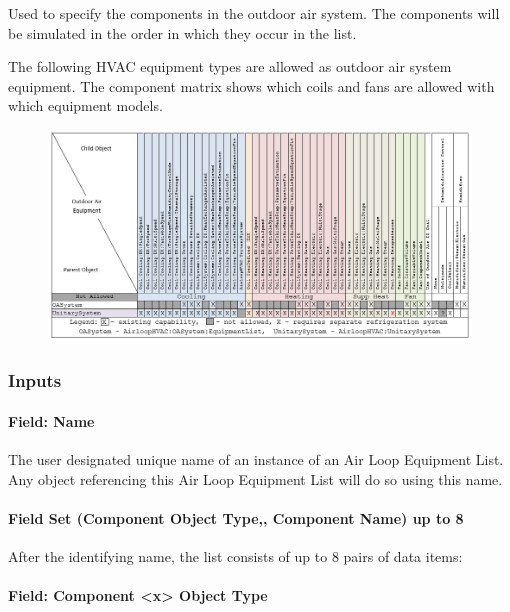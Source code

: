Used to specify the components in the outdoor air system. The components will be simulated in the order in which they occur in the list.

The following HVAC equipment types are allowed as outdoor air system equipment. The component matrix shows which coils and fans are allowed with which equipment models.

\begin{figure}[htbp]
\centering
\includegraphics{media/OASysComponentMatrix.png}
\caption{}
\end{figure}

\subsubsection{Inputs}\label{inputs-4-001}

\paragraph{Field: Name}\label{field-name-4-001}

The user designated unique name of an instance of an Air Loop Equipment List. Any object referencing this Air Loop Equipment List will do so using this name.

\paragraph{Field Set (Component Object Type,, Component Name) up to 8}\label{field-set-component-object-type-component-name-up-to-8}

After the identifying name, the list consists of up to 8 pairs of data items:

\paragraph{Field: Component \textless{}x\textgreater{} Object Type}\label{field-component-x-object-type}

